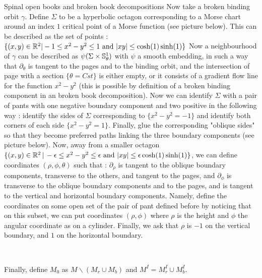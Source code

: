 \documentclass[../main.tex]{subfiles}
\begin{document}
\begin{section}{Spinal open books and broken book decompositions}
Now take a broken binding orbit $\gamma$. Define $\Sigma$ to be a hyperbolic octagon corresponding to a Morse chart around an index $1$ critical point of a Morse function (see picture below). This can be described as the set of points : $\{(x,y)\in\mathbb{R}^2 |-1\leq  x^2-y^2\leq 1 \text{ and  } |xy|\leq \cosh(1)\sinh(1)\}$ Now a neighbourhood of $\gamma$ can be described as $\psi(\Sigma\times \mathbb{S}^1_\theta)$ with $\psi$ a smooth embedding, in such a way that $\partial_\theta$ is tangent to the pages and to the binding orbit, and the intersection of page with a section $\{\theta = Cst\}$ is either empty, or it consists of a gradient flow line for the function $x^2- y^2$ (this is possible by definition of a broken binding component in an broken book decomposition). Now we can identify $\Sigma$ with a pair of pants with one negative boundary component and two positive in the following way : identify the sides of $\Sigma$ corresponding to $\{x^2-y^2 = -1\}$ and identify both corners of each side $\{x^2- y^2 = 1\}$. Finally, glue the corresponding "oblique sides" so that they become preferred paths linking the three boundary components (see picture below). Now, away from a smaller octagon $\{(x,y)\in \mathbb{R}^2 \,|\, -\epsilon\leq x^2- y^2 \leq \epsilon\text{ and } |xy|\leq \epsilon\cosh(1)\sinh(1)\}$, we can define coordinates $(\rho,\phi,\theta)$ such that : $\partial_\rho$ is tangent to the oblique boundary components, transverse to the others, and tangent to the pages, and $\partial_\phi$ is transverse to the oblique boundary components and to the pages, and is tangent to the vertical and horizontal boundary components. Namely, define the coordinates on some open set of the pair of pant defined before by noticing that on this subset, we can put coordinates $(\rho,\phi)$ where $\rho$ is the height and $\phi$ the angular coordinate as on a cylinder. Finally, we ask that $\rho$ is $-1$ on the vertical boundary, and $1$ on the horizontal boundary. 


\\
\color{black}

Finally, define $M_0$ as $M\backslash{(M_r\cup M_b)}$ and $M^I = M^I_r\cup M^I_b$.



\end{section}
\end{document}
